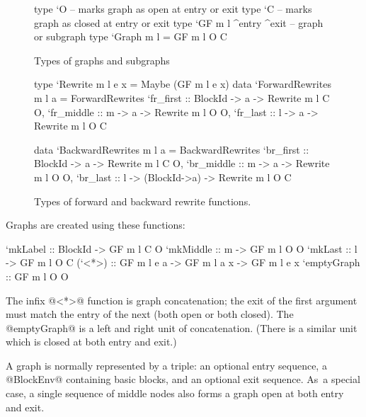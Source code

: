 \documentclass[blockstyle,preprint,natbib,nocopyrightspace]{sigplanconf}
\newcommand\figlabel[1]{\label{fig:#1}}
\begin{document}
\begin{figure}
\begin{code}
type `O  -- marks graph as open   at entry or exit
type `C  -- marks graph as closed at entry or exit
type `GF m l ^entry ^exit -- graph or subgraph
type `Graph m l = GF m l O C
\end{code}

\caption{Types of graphs and subgraphs}
\figlabel{subgraphs}

\bigskip 


\begin{code}
type `Rewrite m l e x = Maybe (GF m l e x)
data `ForwardRewrites m l a = ForwardRewrites
 {`fr_first  :: BlockId -> a -> Rewrite m l C O,
  `fr_middle :: m       -> a -> Rewrite m l O O,
  `fr_last   :: l       -> a -> Rewrite m l O C} 

data `BackwardRewrites m l a = BackwardRewrites
 {`br_first  :: BlockId -> a      -> Rewrite m l C O,
  `br_middle :: m       -> a      -> Rewrite m l O O,
  `br_last   :: l -> (BlockId->a) -> Rewrite m l O C} 
\end{code}
\caption{Types of forward and backward rewrite functions.}
\figlabel{rewrites}
\end{figure}



Graphs are created using these functions:
\begin{code}
`mkLabel    :: BlockId    -> GF m l C O
`mkMiddle   :: m          -> GF m l O O
`mkLast     :: l          -> GF m l O C
(`<*>)      :: GF m l e a -> GF m l a x 
                         -> GF m l e x
`emptyGraph :: GF m l O O
\end{code}
The infix @<*>@ function is graph concatenation; the exit of the first
argument must match the entry of the next (both open or both closed).
The @emptyGraph@ is a left and right unit of concatenation.
(There is a similar unit which is closed at both entry and exit.)




A graph is normally represented by a triple:
an optional entry sequence, a @BlockEnv@ containing basic blocks,
and an optional exit sequence.
As~a special case, a single sequence of middle nodes also forms a
graph open at both entry and exit.
\end{document}
